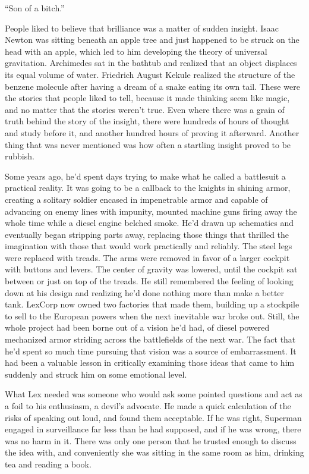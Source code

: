 \documentclass[ebook,12pt]{memoir}
\begin{document}
``Son of a bitch.''

People liked to believe that brilliance was a matter of sudden insight.
Isaac Newton was sitting beneath an apple tree and just happened to be
struck on the head with an apple, which led to him developing the theory
of universal gravitation. Archimedes sat in the bathtub and realized
that an object displaces its equal volume of water. Friedrich August
Kekule realized the structure of the benzene molecule after having a
dream of a snake eating its own tail. These were the stories that people
liked to tell, because it made thinking seem like magic, and no matter
that the stories weren't true. Even where there was a grain of truth
behind the story of the insight, there were hundreds of hours of thought
and study before it, and another hundred hours of proving it afterward.
Another thing that was never mentioned was how often a startling insight
proved to be rubbish.

Some years ago, he'd spent days trying to make what he called a
battlesuit a practical reality. It was going to be a callback to the
knights in shining armor, creating a solitary soldier encased in
impenetrable armor and capable of advancing on enemy lines with
impunity, mounted machine guns firing away the whole time while a diesel
engine belched smoke. He'd drawn up schematics and eventually began
stripping parts away, replacing those things that thrilled the
imagination with those that would work practically and reliably. The
steel legs were replaced with treads. The arms were removed in favor of
a larger cockpit with buttons and levers. The center of gravity was
lowered, until the cockpit sat between or just on top of the treads. He
still remembered the feeling of looking down at his design and realizing
he'd done nothing more than make a better tank. LexCorp now owned two
factories that made them, building up a stockpile to sell to the
European powers when the next inevitable war broke out. Still, the whole
project had been borne out of a vision he'd had, of diesel powered
mechanized armor striding across the battlefields of the next war. The
fact that he'd spent so much time pursuing that vision was a source of
embarrassment. It had been a valuable lesson in critically examining
those ideas that came to him suddenly and struck him on some emotional
level.

What Lex needed was someone who would ask some pointed questions and act
as a foil to his enthusiasm, a devil's advocate. He made a quick
calculation of the risks of speaking out loud, and found them
acceptable. If he was right, Superman engaged in surveillance far less
than he had supposed, and if he was wrong, there was no harm in it.
There was only one person that he trusted enough to discuss the idea
with, and conveniently she was sitting in the same room as him, drinking
tea and reading a book.
\end{document}
